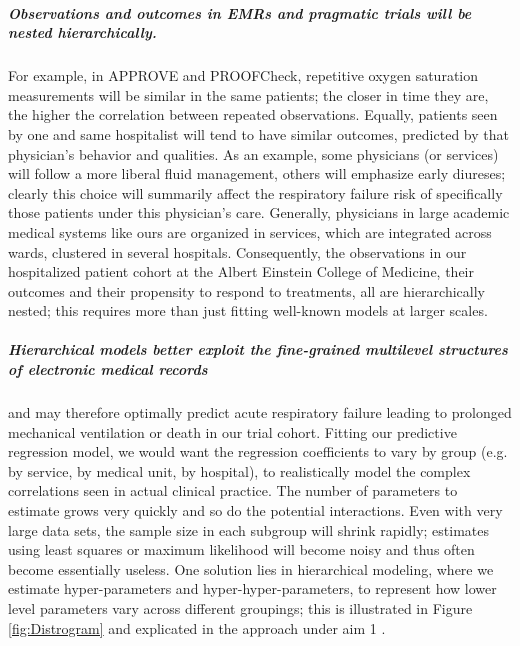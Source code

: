 \documentclass[11pt,notitlepage]{article}
\begin{document}
\subparagraph{Observations and outcomes in EMRs and pragmatic trials will be nested hierarchically.}
For example, in APPROVE and PROOFCheck, repetitive oxygen saturation measurements will be similar in the same patients; the closer in time they are, the higher the correlation between repeated observations. Equally, patients seen by one and same hospitalist will tend to have similar outcomes, predicted by that physician's behavior and qualities. As an example, some physicians (or services) will follow a more liberal fluid management, others will emphasize early diureses; clearly this choice will summarily affect the respiratory failure risk of specifically those patients under this physician's care. Generally, physicians in large academic medical systems like ours are organized in services, which are integrated across wards, clustered in several hospitals. Consequently, the observations in our hospitalized patient cohort at the Albert Einstein College of Medicine, their outcomes and their propensity to respond to treatments, all are hierarchically nested; this requires more than just fitting well-known models at larger scales. 

\subparagraph*{Hierarchical models better exploit the fine-grained multilevel structures of electronic medical records} and may therefore optimally predict acute respiratory failure leading to prolonged mechanical ventilation or death in our trial cohort. Fitting our predictive regression model, we would want the regression coefficients to vary by group (e.g. by service, by medical unit, by hospital), to realistically model the complex correlations seen in actual clinical practice. The number of parameters to estimate grows very quickly and so do the potential interactions. Even with very large data sets, the sample size in each subgroup will shrink rapidly; estimates using least squares or maximum likelihood will become noisy and thus often become essentially useless. One solution lies in hierarchical modeling, where we estimate hyper-parameters and hyper-hyper-parameters, to represent how lower level parameters vary across different groupings; this is illustrated in Figure \ref{fig:Distrogram} and explicated in the approach under aim 1 \cite{Bafumi_Gelman_2007}. 
\end{document}
